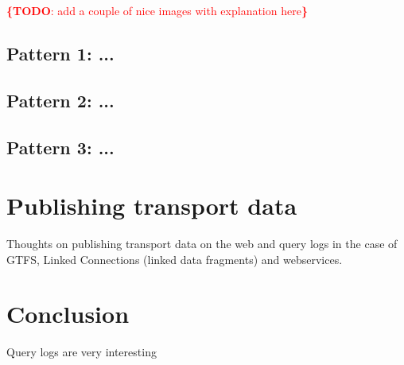 \documentclass{sig-alternate}
\newcommand{\todo}[1]{\noindent\textcolor{red}{{\bf \{TODO}: #1{\bf \}}}}
\begin{document}
\todo{add a couple of nice images with explanation here}

\subsection{Pattern 1: ...}
\label{sec:pattern1}

\subsection{Pattern 2: ...}
\label{sec:pattern2}

\subsection{Pattern 3: ...}
\label{sec:pattern3}

\section{Publishing transport data}

Thoughts on publishing transport data on the web and query logs in the case of GTFS, Linked Connections\cite{lc} (linked data fragments\cite{ldf}) and webservices.

\section{Conclusion}
\label{sec:conclusion}

Query logs are very interesting

\let\oldsection\section
\renewcommand{\section}[2][1]{\oldsection{#1}\vspace{-3pt}}



\end{document}
